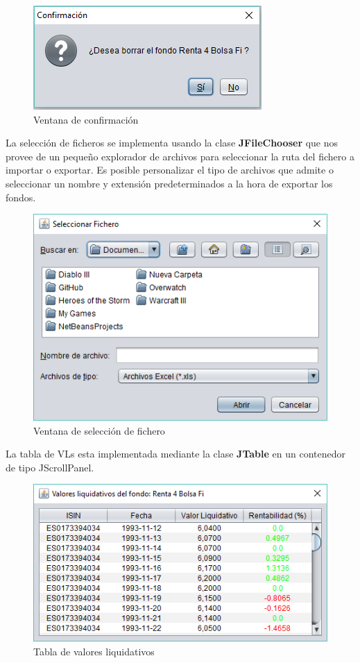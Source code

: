 \documentclass[12pt, a4paper]{book}
\begin{document}
	\begin{figure}[htbp]
	\centering
	\includegraphics{figuras/confirmacion.PNG}
	\caption{Ventana de confirmación}
	\label{fig:confirmacion}
	\end {figure}
\newpage

La selección de ficheros se implementa usando la clase \textbf{JFileChooser} que nos provee de un pequeño explorador de archivos para seleccionar la ruta del fichero a importar o exportar. Es posible personalizar el tipo de archivos que admite o seleccionar un nombre y extensión predeterminados a la hora de exportar los fondos.

	\begin{figure}[htbp]
	\centering
	\includegraphics{figuras/fichero.PNG}
	\caption{Ventana de selección de fichero}
	\label{fig:fichero}
	\end {figure}

La tabla de \gls{VL}s esta implementada mediante la clase \textbf{JTable} en un contenedor de tipo JScrollPanel.

	\begin{figure}[htbp]
	\centering
	\includegraphics[width=12cm]{figuras/vls.PNG}
	\caption{Tabla de valores liquidativos}
	\label{fig:vls}
	\end {figure}
	
\end{document}
